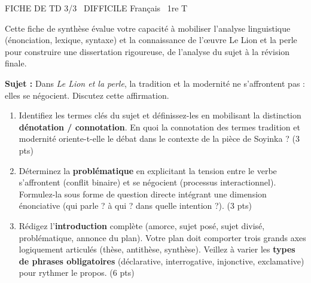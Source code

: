 \documentclass[11pt]{article}
\begin{document}
\begin{tcolorbox}[enhanced,colback=popink,colframe=popink,arc=10pt,boxrule=0pt,left=12pt,right=12pt,top=9pt,bottom=9pt]
{\color{white}\popxbold\small FICHE DE TD 3/3 \textbullet\ DIFFICILE \hfill Français \textbullet\ 1re T\par}
\end{tcolorbox}
\vspace{4pt}
\noindent Cette fiche de synthèse évalue votre capacité à mobiliser l'analyse linguistique (énonciation, lexique, syntaxe) et la connaissance de l'œuvre \og Le Lion et la perle \fg{} pour construire une dissertation rigoureuse, de l'analyse du sujet à la révision finale.

\begin{exercice}
\textbf{Sujet :} \og Dans \textit{Le Lion et la perle}, la tradition et la modernité ne s'affrontent pas : elles se négocient. \fg{} Discutez cette affirmation.

\begin{enumerate}
    \item Identifiez les termes clés du sujet et définissez-les en mobilisant la distinction \textbf{dénotation / connotation}. En quoi la connotation des termes \og tradition \fg{} et \og modernité \fg{} oriente-t-elle le débat dans le contexte de la pièce de Soyinka ? (3 pts)
    \item Déterminez la \textbf{problématique} en explicitant la tension entre le verbe \og s'affrontent \fg{} (conflit binaire) et \og se négocient \fg{} (processus interactionnel). Formulez-la sous forme de question directe intégrant une dimension énonciative (qui parle ? à qui ? dans quelle intention ?). (3 pts)
    \item Rédigez l'\textbf{introduction} complète (amorce, sujet posé, sujet divisé, problématique, annonce du plan). Votre plan doit comporter trois grands axes logiquement articulés (thèse, antithèse, synthèse). Veillez à varier les \textbf{types de phrases obligatoires} (déclarative, interrogative, injonctive, exclamative) pour rythmer le propos. (6 pts)
\end{enumerate}
\end{exercice}
\end{document}
